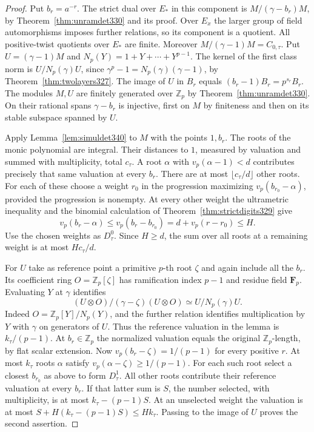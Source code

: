 \documentclass[a4paper,11pt]{article}
\theoremstyle{definition}
\theoremstyle{remark}
\newcommand{\ZZ}{\mathbb Z}\newcommand{\ord}{\operatorname{ord}}
\numberwithin{equation}{section}
\begin{document}
\begin{proof}
Put $b_r=a^{-r}$. The strict dual over $E_*$ in this component is
$M/(\gamma-b_r)M$, by Theorem~\ref{thm:unramdet330} and its proof.
Over $E_x$ the larger group of field automorphisms imposes further
relations, so its component is a quotient. All positive-twist
quotients over $E_*$ are finite. Moreover $M/(\gamma-1)M=C_{0,\tau}$.
Put $U=(\gamma-1)M$ and $N_p(Y)=1+Y+\cdots+Y^{p-1}$.
The kernel of the first class norm is $U/N_p(\gamma)U$, since
$\gamma^p-1=N_p(\gamma)(\gamma-1)$, by
Theorem~\ref{thm:twolayers327}. The image of $U$ in $B_r$ equals
$(b_r-1)B_r=p^{s_r}B_r$. The modules $M,U$ are finitely generated
over $\ZZ_p$ by Theorem~\ref{thm:unramdet330}. On their rational
spans $\gamma-b_r$ is injective, first on $M$ by finiteness and
then on its stable subspace spanned by $U$.

Apply Lemma~\ref{lem:simuldet340} to $M$ with the points $1,b_r$.
The roots of the monic polynomial are integral. Their distances to
$1$, measured by valuation and summed with multiplicity, total
$c_\tau$. A root $\alpha$ with $v_p(\alpha-1)<d$ contributes precisely
that same valuation at every $b_r$. There are at most
$\lfloor c_\tau/d\rfloor$ other roots. For each of these choose a
weight $r_0$ in the progression maximizing $v_p(b_{r_0}-\alpha)$,
provided the progression is nonempty. At every other weight the
ultrametric inequality and the binomial calculation of
Theorem~\ref{thm:strictdigits329} give
\[
 v_p(b_r-\alpha)\le v_p(b_r-b_{r_0})
            =d+v_p(r-r_0)\le H.
\]
Use the chosen weights as $D^0_\tau$. Since $H\ge d$, the sum over
all roots at a remaining weight is at most $Hc_\tau/d$.

For $U$ take as reference point a primitive $p$-th root $\zeta$ and
again include all the $b_r$. Its coefficient ring $O=\ZZ_p[\zeta]$
has ramification index $p-1$ and residue field $\mathbf F_p$.
Evaluating $Y$ at $\gamma$ identifies
\[
 (U\otimes O)/(\gamma-\zeta)(U\otimes O)
                   \simeq U/N_p(\gamma)U .
\]
Indeed $O=\ZZ_p[Y]/N_p(Y)$, and the further relation identifies
multiplication by $Y$ with $\gamma$ on generators of $U$. Thus the
reference valuation in the lemma is $k_\tau/(p-1)$. At $b_r\in\ZZ_p$
the normalized valuation equals the original $\ZZ_p$-length, by
flat scalar extension. Now $v_p(b_r-\zeta)=1/(p-1)$ for every
positive $r$. At most $k_\tau$ roots $\alpha$ satisfy
$v_p(\alpha-\zeta)\ge1/(p-1)$. For each such root select a closest $b_{r_0}$ as
above to form $D^1_\tau$. All other roots contribute their reference
valuation at every $b_r$. If that latter sum is $S$, the number
selected, with multiplicity, is at most $k_\tau-(p-1)S$. At an
unselected weight the valuation is at most
$S+H(k_\tau-(p-1)S)\le Hk_\tau$. Passing to the image of $U$
proves the second assertion.
\end{proof}
\end{document}
